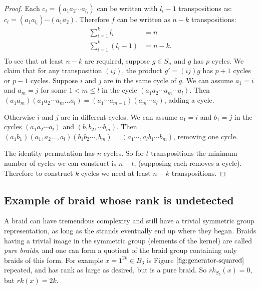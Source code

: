 \documentclass[12pt]{thesis}
\begin{document}
\begin{proof}
    Each $c_{i} = (a_{1} a_{2} \cdots a_{l_{i}})$ can be written
    with $l_{i} - 1$  transpositions
    as: $c_{i} = (a_{1}a_{l_{i}}) \cdots (a_{1} a_{2})$.
    Therefore $f$ can be written as $n - k$ transpositions:
    \[
    \begin{split}
        \sum_{i=1}^{k} l_{i} &= n  \\
        \sum_{i=1}^{k} (l_{i} - 1) &= n - k. \\
    \end{split}
    \]
    To see that at least $n - k$ are required, suppose $g \in S_{n}$
    and $g$ has $p$ cycles.
    We claim that for any transposition $(i j)$,
    the product $g' = (i j)g$ has $p+1$ cycles 
    or $p - 1$ cycles.
    Suppose $i$ and $j$ are in the same cycle of $g$.
    We can assume $a_{1} = i$ and $a_{m} = j$ for some $1 < m \leq l$ in the cycle $(a_{1} a_{2} \cdots a_{m} \cdots a_{l})$.
    Then $(a_{1} a_{m}) (a_{1} a_{2} \cdots a_{m} \ldots a_{l}) = (a_{1} \cdots a_{m - 1}) (a_{m} \cdots a_{l})$,
    adding a cycle.

    Otherwise $i$ and $j$ are in different cycles.
    We can assume $a_{1} = i$ and $b_{1} = j$ in the cycles $(a_{1} a_{2} \cdots a_{l})$
    and $(b_{1} b_{2}, \cdots b_{m})$.
    Then $(a_{1} b_{1}) (a_{1}, a_{2} \ldots, a_{l}) (b_{1} b_{2} \cdots, b_{m})
    = (a_{1} \cdots, a_{l}b_{1} \cdots b_{m})$,
    removing one cycle.

    The identity permutation has $n$ cycles.
    So for $t$ transpositions the minimum number of
    cycles we can construct is $n - t$,
    (supposing each removes a cycle).
    Therefore to construct $k$ cycles
    we need at least $n - k$ transpositions.
\end{proof}

\subsection{Example of braid whose rank is undetected}

A braid can have tremendous complexity and still have a
trivial symmetric group representation, as long as the strands
eventually end up where they began.
Braids having a trivial image in the symmetric group (elements of the kernel) are called \textit{pure braids},
and one can form a quotient of the braid group
containing only braids of this form.
For example $x = 1^{2k} \in B_{3}$ is Figure $\ref{fig:generator-squared}$ repeated,
and has rank as large as desired, but is a pure braid.
So $rk_{S_{3}}(x) = 0$, but $rk(x) = 2k$. 
\end{document}
